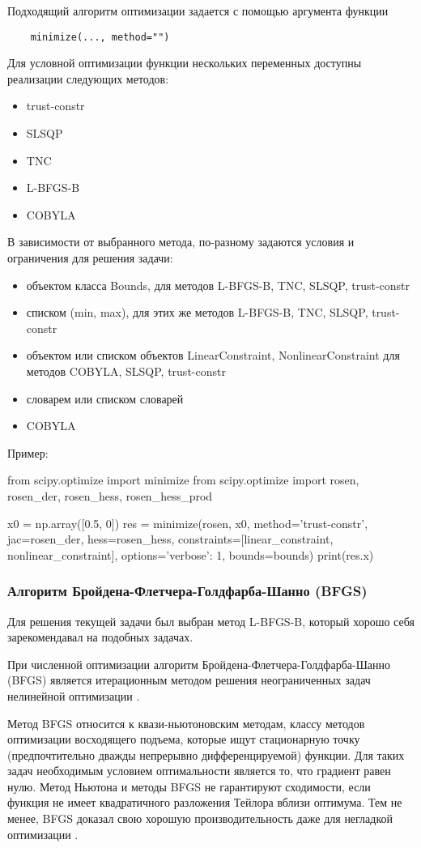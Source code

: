 \documentclass[12pt]{article} %
\begin{document}
Подходящий алгоритм оптимизации задается с помощью аргумента функции\cite{2}
\begin{lstlisting}
	minimize(..., method="")
\end{lstlisting}
Для условной оптимизации функции нескольких переменных доступны реализации следующих методов:\cite{2}
\begin{itemize}
	\item trust-constr
	\item SLSQP
	\item TNC
	\item L-BFGS-B
	\item COBYLA
\end{itemize}	
В зависимости от выбранного метода, по-разному задаются условия и ограничения для решения задачи:\cite{2}
\begin{itemize}
	\item объектом класса Bounds, для методов L-BFGS-B, TNC, SLSQP, trust-constr
	\item списком (min, max), для этих же методов L-BFGS-B, TNC, SLSQP, trust-constr
	\item объектом или списком объектов LinearConstraint, NonlinearConstraint для методов COBYLA, SLSQP, trust-constr
	\item словарем или списком словарей
	\item COBYLA
\end{itemize}	
Пример:
\begin{listing}[1]{1}
from scipy.optimize import minimize
from scipy.optimize import rosen, rosen_der, rosen_hess, rosen_hess_prod

x0 = np.array([0.5, 0])
res = minimize(rosen, x0, method='trust-constr', jac=rosen_der, hess=rosen_hess,
constraints=[linear_constraint, nonlinear_constraint],
options={'verbose': 1}, bounds=bounds)
print(res.x)
\end{listing}

\subsubsection{Алгоритм Бройдена-Флетчера-Голдфарба-Шанно (BFGS)}
Для решения текущей задачи был выбран метод L-BFGS-B, который хорошо себя зарекомендавал на подобных задачах.


При численной оптимизации алгоритм Бройдена-Флетчера-Голдфарба-Шанно (BFGS) является итерационным методом решения неограниченных задач нелинейной оптимизации \cite{3}.

Метод BFGS относится к квази-ньютоновским методам, классу методов оптимизации восходящего подъема, которые ищут стационарную точку (предпочтительно дважды непрерывно дифференцируемой) функции. Для таких задач необходимым условием оптимальности является то, что градиент равен нулю. Метод Ньютона и методы BFGS не гарантируют сходимости, если функция не имеет квадратичного разложения Тейлора вблизи оптимума. Тем не менее, BFGS доказал свою хорошую производительность даже для негладкой оптимизации \cite{4}.
\end{document}
